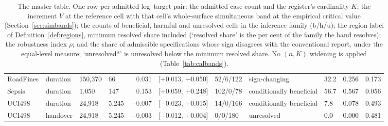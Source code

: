 \begin{table}[t]
{\begin{tabular}{llllrllllrr}
RoadFines & duration & 150,370 & 66 & 0.031 & [+0.013, +0.050] & 52/6/122 & sign-changing & 32.2 & 0.256 & 0.173 \\
Sepsis & duration & 1,050 & 147 & 0.153 & [+0.059, +0.248] & 102/0/78 & conditionally beneficial & 56.7 & 0.567 & 0.056 \\
UCI498 & duration & 24,918 & 5,245 & $-$0.007 & [$-$0.023, +0.015] & 14/0/166 & conditionally beneficial & 7.8 & 0.078 & 0.493 \\
UCI498 & handover & 24,918 & 5,245 & $-$0.003 & [$-$0.012, +0.004] & 0/0/180 & unresolved & 0.0 & 0.000 & 0.481 \\
\bottomrule
\end{tabular}%
}
\caption{The master table. One row per admitted log--target pair: the admitted case count and the register's cardinality $K$; the increment $V$ at the reference cell with that cell's whole-surface simultaneous band at the empirical critical value (Section~\ref{sec:simbands}); the counts of beneficial, harmful and unresolved cells in the inference family (b/h/u); the region label of Definition~\ref{def:regions}, minimum resolved share included (`resolved share' is the per cent of the family the band resolves); the robustness index $\rho$; and the share of admissible specifications whose sign disagrees with the conventional report, under the equal-level measure; `unresolved*' is unresolved below the minimum resolved share. No $(n,K)$ widening is applied (Table~\ref{tab:calbands}).}
\label{tab:master}
\end{table}
